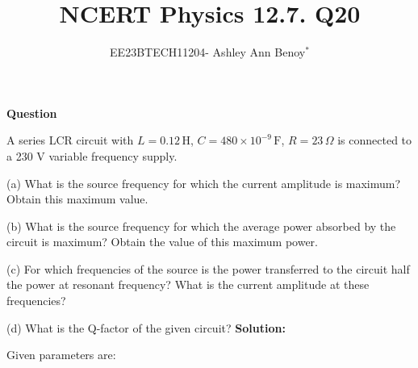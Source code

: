 \documentclass[journal,12pt,twocolumn]{IEEEtran}
\theoremstyle{remark}
\begin{document}

\vspace{3cm}

\title{NCERT Physics 12.7. Q20}
\author{EE23BTECH11204- Ashley Ann Benoy$^{*}$%
}
\maketitle
\newpage
\bigskip



\textbf{Question}

A series LCR circuit with 
\(L = 0.12 \, \text{H}\),
\(C = 480 \times 10^{-9} \, \text{F}\), 
\(R=23 \, \Omega\)
is connected to a 230 V variable frequency supply.

(a) What is the source frequency for which the current amplitude is maximum? Obtain this maximum value.

(b) What is the source frequency for which the average power absorbed by the circuit is maximum? Obtain the value of this maximum power.

(c) For which frequencies of the source is the power transferred to the circuit half the power at resonant frequency? What is the current amplitude at these frequencies?

(d) What is the Q-factor of the given circuit?
\fi
\textbf{Solution:}

Given parameters are:



\end{document}
